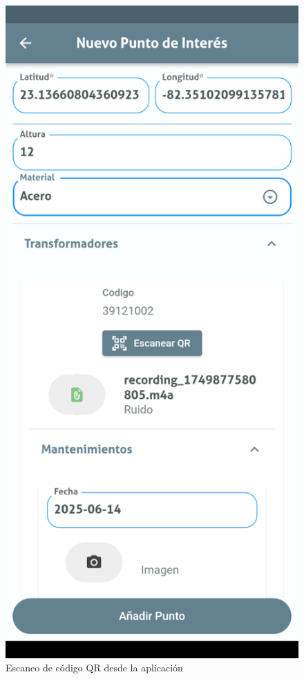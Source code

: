 \documentclass[12pt, a4paper]{book}
\begin{document}
\begin{figure}[H]
\begin{minipage}[b]{0.3\textwidth}
    \caption{Escaneo de código QR desde la aplicación}
    \label{fig:medias1}
  \end{minipage}
  \hspace{0.02\textwidth}
  \begin{minipage}[b]{0.3\textwidth}
    \centering
    \includegraphics[width=\textwidth]{images/functionality_test/medias_1.png}

\end{minipage}
\end{figure}
\end{document}
